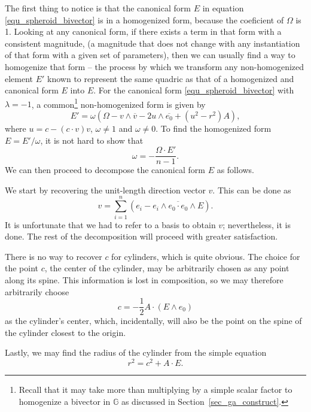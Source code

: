 \documentclass{birkjour}
\theoremstyle{definition}
\theoremstyle{remark}
\numberwithin{equation}{section}
\newcommand{\G}{\mathbb{G}}
\begin{document}
The first thing to notice is that the canonical form $E$ in equation \eqref{equ_spheroid_bivector}
is in a homogenized form, because the coeficient of $\Omega$ is 1.  Looking at any canonical form,
if there exists a term in that form with a consistent magnitude, (a magnitude that does not change
with any instantiation of that form with a given set of parameters), then we can usually find a way
to homogenize that form -- the process by which we transform any non-homogenized element $E'$
known to represent the same quadric as that of a homogenized and canonical form $E$ into $E$.
For the canonical form \eqref{equ_spheroid_bivector} with $\lambda=-1$, a common\footnote{Recall
that it may take more than multiplying by a simple scalar factor to homogenize a bivector in $\G$
as discussed in Section~\ref{sec_ga_construct}.}
non-homogenized form is given by
\begin{equation}
E' = \omega(\Omega - v\wedge\overline{v}-2u\wedge\overline{e_0}+(u^2-r^2)A),
\end{equation}
where $u=c-(c\cdot v)v$, $\omega\neq 1$ and $\omega\neq 0$.  To find the homogenized form $E=E'/\omega$,
it is not hard to show that
\begin{equation}
\omega = -\frac{\Omega\cdot E'}{n-1}.
\end{equation}
We can then proceed to decompose the canonical form $E$ as follows.

We start by recovering the unit-length direction vector $v$.  This can be
done as
\begin{equation}
v = \sum_{i=1}^n\left(e_i-\overline{e_i\wedge e_0\cdot e_0\wedge E}\right).
\end{equation}
It is unfortunate that we had to refer to a basis to obtain $v$; nevertheless,
it is done.  The rest of the decomposition will proceed with greater satisfaction.

There is no way to recover $c$ for cylinders, which is quite obvious.
The choice for the point $c$, the center of the cylinder, may be arbitrarily
chosen as any point along its spine.  This information is lost in composition,
so we may therefore arbitrarily choose
\begin{equation}
c=-\frac{1}{2}A\cdot(E\wedge e_0)
\end{equation}
as the cylinder's center, which, incidentally, will also be the point on the spine of
the cylinder closest to the origin.

Lastly, we may find the radius of the cylinder from the simple equation
\begin{equation}
r^2 = c^2 + A\cdot E.
\end{equation}
\end{document}
